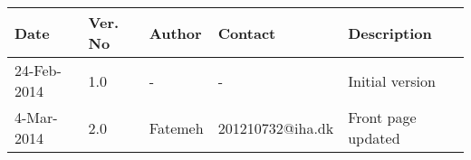\begin{center}
    \begin{tabular}{ | l | p{1cm} | l | l | p{4cm} |}
    \hline
    Date&Ver. No & Author &Contact &Description\\ \hline
	24-Feb-2014&1.0 & - & - & Initial version\\
	4-Mar-2014&2.0 & Fatemeh & 201210732@iha.dk & Front page updated\\
    \hline
    \end{tabular}
\end{center}